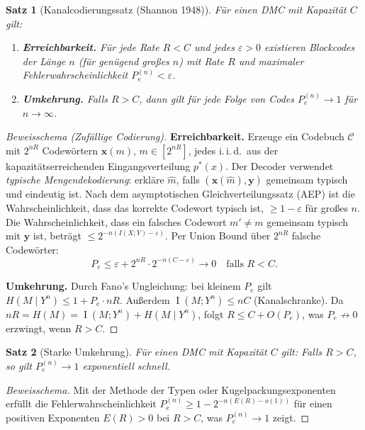 \documentclass[12pt,a4paper]{amsart}
\newtheorem{theorem}{Satz}[section]
\theoremstyle{definition}
\theoremstyle{remark}
\DeclareMathOperator{\MI}{I}
\begin{document}
\begin{theorem}[Kanalcodierungssatz (Shannon 1948)]\label{satz:kanalcodierung}
Für einen DMC mit Kapazität $C$ gilt:
\begin{enumerate}[label=(\alph*)]
  \item \textbf{Erreichbarkeit.} Für jede Rate $R < C$ und jedes $\varepsilon > 0$
        existieren Blockcodes der Länge $n$ (für genügend großes $n$) mit Rate $R$
        und maximaler Fehlerwahrscheinlichkeit $P_e^{(n)} < \varepsilon$.
  \item \textbf{Umkehrung.} Falls $R > C$, dann gilt für jede Folge von Codes
        $P_e^{(n)} \to 1$ für $n \to \infty$.
\end{enumerate}
\end{theorem}
\begin{proof}[Beweisschema (Zufällige Codierung)]
\textbf{Erreichbarkeit.} Erzeuge ein Codebuch $\mathcal{C}$ mit $2^{nR}$
Codewörtern $\mathbf{x}(m)$, $m \in [2^{nR}]$, jedes i.\,i.\,d.\ aus der
kapazitätserreichenden Eingangsverteilung $p^*(x)$. Der Decoder verwendet
\emph{typische Mengendekodierung}: erkläre $\hat{m}$, falls
$(\mathbf{x}(\hat{m}), \mathbf{y})$ gemeinsam typisch und eindeutig ist.
Nach dem asymptotischen Gleichverteilungssatz (AEP) ist die Wahrscheinlichkeit,
dass das korrekte Codewort typisch ist, $\geq 1-\varepsilon$ für großes $n$.
Die Wahrscheinlichkeit, dass ein falsches Codewort $m' \neq m$ gemeinsam typisch
mit $\mathbf{y}$ ist, beträgt $\leq 2^{-n(I(X;Y)-\varepsilon)}$. Per Union Bound
über $2^{nR}$ falsche Codewörter:
\[
  P_e \leq \varepsilon + 2^{nR} \cdot 2^{-n(C-\varepsilon)} \to 0 \quad \text{falls } R < C.
\]

\textbf{Umkehrung.} Durch Fano's Ungleichung: bei kleinem $P_e$ gilt
$H(M \mid Y^n) \leq 1 + P_e \cdot nR$. Außerdem $\MI(M; Y^n) \leq nC$ (Kanalschranke).
Da $nR = H(M) = \MI(M;Y^n) + H(M\mid Y^n)$, folgt $R \leq C + O(P_e)$,
was $P_e \not\to 0$ erzwingt, wenn $R > C$.
\end{proof}

\begin{theorem}[Starke Umkehrung]\label{satz:starke-umkehrung}
Für einen DMC mit Kapazität $C$ gilt: Falls $R > C$, so gilt
$P_e^{(n)} \to 1$ exponentiell schnell.
\end{theorem}
\begin{proof}[Beweisschema]
Mit der Methode der Typen oder Kugelpackungsexponenten erfüllt die
Fehlerwahrscheinlichkeit $P_e^{(n)} \geq 1 - 2^{-n(E(R) - o(1))}$ für einen
positiven Exponenten $E(R)>0$ bei $R>C$, was $P_e^{(n)} \to 1$ zeigt.
\end{proof}
\end{document}
